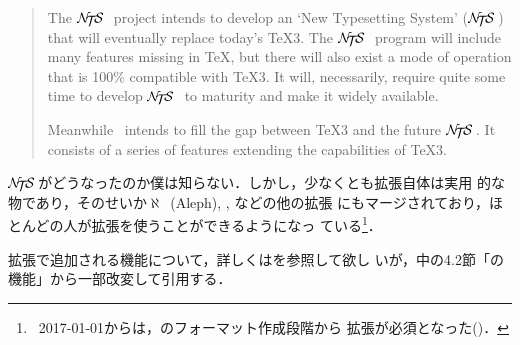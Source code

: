 \documentclass[a4paper,11pt,nomag]{jsarticle}
\def\NTS{\leavevmode\hbox{$\cal N\kern-0.35em\lower0.5ex\hbox{$\cal T$}%
  \kern-0.2emS$}\,}
\begin{document}
\begin{quotation}
The \NTS\ project intends to develop an `New Typesetting System' (\NTS)
that will eventually replace today's \TeX3.  The \NTS\ program will
include many features missing in \TeX, but there will also exist a mode
of operation that is 100\% compatible with \TeX3.  It will, necessarily,
require quite some time to develop \NTS\ to maturity and make it widely
available.

Meanwhile \eTeX\ intends to fill the gap between \TeX3 and the future
\NTS. It consists of a series of features extending the capabilities of
\TeX3.
\end{quotation}

\NTS がどうなったのか僕は知らない．しかし，少なくとも\eTeX 拡張自体は実用
的な物であり，そのせいか$\aleph$~(Aleph), , などの他の拡張
にもマージされており，ほとんどの人が\eTeX 拡張を使うことができるようになっ
ている\footnote{\LaTeXe~2017-01-01からは，\LaTeXe のフォーマット作成段階から
\eTeX 拡張が必須となった(\cite{l2e26})．}．

\eTeX 拡張で追加される機能について，詳しくは\cite{etexman}を参照して欲し
いが，\cite{h7k}中の4.2節「\eTeX の機能」から一部改変して引用する．
\end{document}
